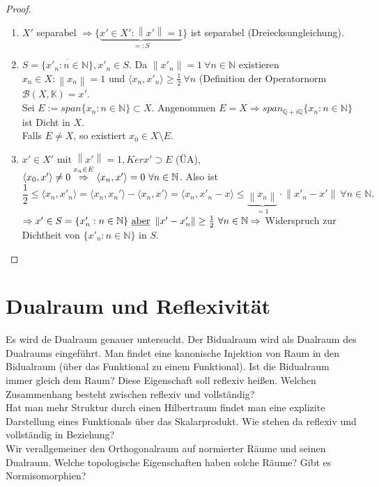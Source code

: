 \documentclass[ngerman]{report}
\theoremstyle{plain}%
\theoremstyle{definition}%
\theoremstyle{myStyle}
\newcommand{\Q}{\mathbb{Q}}
\newcommand{\N}{\mathbb{N}}
\newcommand{\K}{\mathbb{K}}
\newcommand{\B}{\mathcal{B}} %
\newcommand{\norm}[1]{\left \|#1\right\| }
\newcommand{\df}[1][]{%
	\overset{#1}{\Rightarrow}
}
\newcommand{\f}[2]{\langle #1,#2 \rangle} %
\begin{document}
	\begin{proof}
		\begin{enumerate}[1)]
			\item $X'$ separabel $\df \{\underbrace{x' \in X': \norm{x'}=1}_{=:S}\}$ ist separabel (Dreiecksungleichung).
			
			\item $S=\overline{\{x'_n : n \in \N\}}, x'_n \in S.$ Da $\norm{x'_n}=1 ~\forall n \in \N$ existieren $x_n \in X: \norm{x_n}=1$ und $\f{x_n}{x'_n} \geq \frac{1}{2} ~\forall n$ (Definition der Operatornorm $\B(X,\K)=x'$.\\
			Sei $E:=span\{x_n : n \in \N\} \subset X.$ Angenommen $E=X \df span_{\Q + i\Q}\{x_n : n \in \N\}$ ist Dicht in $X$. \\
			Falls $E\neq X$, so existiert $x_0 \in X\setminus E$.
			
			\item $x' \in X'$ mit $\norm{x'}=1, Ker x' \supset E$ (ÜA), $\f{x_0}{x'}\neq 0 \overset{x_n \in E}{\df}\f{x_n}{x'}=0 ~\forall n \in \N$. Also ist
			\[
			\frac{1}{2}\leq \f{x_n}{x'_n} = \f{x_n}{x_n'} - \f{x_n}{x'}= \f{x_n}{x'_n-x} \leq \underbrace{\norm{x_n}}_{=1} \cdot \norm{x'_n-x'} ~\forall n \in \N.
			\]
			$\df x' \in S=\{x'_n : n \in \N\} ~\underline{\text{aber}}~ \norm{x'-x'_n}\geq \frac{1}{2} ~\forall n \in \N \\
			\df$ Widerspruch zur Dichtheit von $\{x'_n : n \in \N\}$ in $S$.
		\end{enumerate}
	\end{proof}


\section{Dualraum und Reflexivität}
\footnotesize
Es wird de Dualraum genauer untersucht. Der Bidualraum wird als Dualraum des Dualraums eingeführt. Man findet eine kanonische Injektion von Raum in den Bidualraum (über das Funktional zu einem Funktional). 
Ist die Bidualraum immer gleich dem Raum? 
Diese Eigenschaft soll reflexiv heißen. Welchen Zusammenhang besteht zwischen reflexiv und vollständig?\\
Hat man mehr Struktur durch einen Hilbertraum findet man eine explizite Darstellung eines Funktionals über das Skalarprodukt. Wie stehen da reflexiv und vollständig in Beziehung?\\
Wir verallgemeiner den Orthogonalraum auf normierter Räume und seinen Dualraum. Welche topologische Eigenschaften haben solche Räume? Gibt es Normisomorphien?
\end{document}
